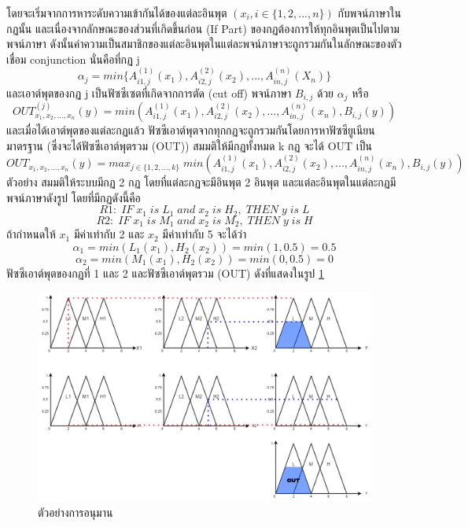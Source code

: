 โดยจะเริ่มจากการหาระดับความเข้ากันได้ของแต่ละอินพุต \((x_{i}, i \in \{1,2,...,n\})\) กับพจน์ภาษาในกฏนั้น และเนื่องจากลักษณะของส่วนที่เกิดขึ้นก่อน (If Part) ของกฏต้องการให้ทุกอินพุตเป็นไปตามพจน์ภาษา ดังนั้นค่าความเป็นสมาชิกของแต่ละอินพุตในแต่ละพจน์ภาษาจะถูกรวมกันในลักษณะของตัวเชื่อม conjunction นั่นคือที่กฏ j
\begin{equation}
\alpha_{j} = min\{A^{(1)}_{i1,j}(x_{1}), A^{(2)}_{i2,j}(x_{2}), ..., A^{(n)}_{in,j}(X_{n})\}
\end{equation}
และเอาต์พุตของกฏ j เป็นฟัซซีเซตที่เกิดจากการตัด (cut off) พจน์ภาษา \(B_{i,j}\) ด้วย \(\alpha_{j}\) หรือ
\begin{equation}
OUT^{(j)}_{x_{1},x_{2},...,x_{n}} (y) = min(A^{(1)}_{i1,j}(x_{1}), A^{(2)}_{i2,j}(x_{2}),...,A^{(n)}_{in,j}(x_{n}),B_{i,j}(y))
\end{equation}
และเมื่อได้เอาต์พุตของแต่ละกฏแล้ว ฟัซซีเอาต์พุตจากทุกกฏจะถูกรวมกันโดยการหาฟัซซียูเนียนมาตรฐาน (ซึ่งจะได้ฟัซซีเอาต์พุตรวม (OUT)) สมมติให้มีกฏทั้งหมด k กฏ จะได้ OUT เป็น
\begin{equation}
OUT_{x_{1},x_{2},...,x_{n}} (y) = max_{j \in \{1,2,...,k\}}\; min(A^{(1)}_{i1,j}(x_{1}), A^{(2)}_{i2,j}(x_{2}),...,A^{(n)}_{in,j}(x_{n}),B_{i,j}(y))
\end{equation}
ตัวอย่าง สมมติให้ระบบมีกฏ 2 กฏ โดยที่แต่ละกฏจะมีอินพุต 2 อินพุต และแต่ละอินพุตในแต่ละกฏมีพจน์ภาษาดังรูป โดยที่มีกฏดังนี้คือ
\[R1:\; IF\; x_{1}\; is\; L_{1}\; and\; x_{2}\; is\; H_{2},\; THEN\; y\; is\; L \]
\[R2:\; IF\; x_{1}\; is\; M_{1}\; and\; x_{2}\; is\; M_{2},\; THEN\; y\; is\; H \]
ถ้ากำหนดให้ \(x_{1}\) มีค่าเท่ากับ 2 และ \(x_{2}\) มีค่าเท่ากับ 5 จะได้ว่า
\[\alpha_{1} = min(L_{1}(x_{1}),H_{2}(x_{2})) = min (1,0.5) = 0.5\]
\[\alpha_{2} = min(M_{1}(x_{1}),H_{2}(x_{2})) = min (0,0.5) = 0\]ฟัซซีเอาต์พุตของกฏที่ 1 และ 2 และฟัซซีเอาต์พุตรวม (OUT) ดังที่แสดงในรูป \ref{fig:4}
\begin{figure}[ht]
    \centering
    \includegraphics[scale=0.3]{images/ex_inference.png}
    \caption{ตัวอย่างการอนุมาน}
    \label{fig:4}
\end{figure}

